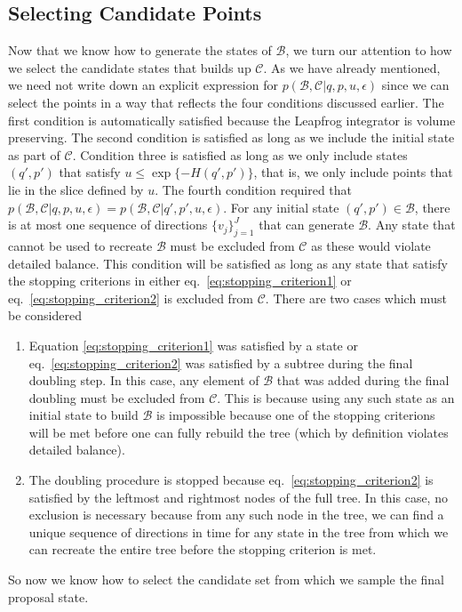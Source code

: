 \subsection{Selecting Candidate Points}
Now that we know how to generate the states of $\mathcal{B}$, we turn our attention to how we select the candidate states that builds up $\mathcal{C}$. 
As we have already mentioned, we need not write down an explicit expression for $p(\mathcal{B}, \mathcal{C}|q, p, u, \epsilon)$ since we can select the points in a way that reflects the four conditions discussed earlier. The first condition is automatically satisfied because the Leapfrog integrator is volume preserving. The second condition is satisfied as long as we include the initial state as part of $\mathcal{C}$. Condition three is satisfied as long as we only include states $(q', p')$ that satisfy $u \leq \exp\{-H(q', p')\}$, that is, we only include points that lie in the slice defined by $u$. The fourth condition required that $p(\mathcal{B}, \mathcal{C}|q, p, u, \epsilon) = p(\mathcal{B}, \mathcal{C}|q', p', u, \epsilon)$. For any initial state $(q', p') \in \mathcal{B}$, there is at most one sequence of directions $\{v_j\}_{j=1}^J$ that can generate $\mathcal{B}$. Any state that cannot be used to recreate $\mathcal{B}$ must be excluded from $\mathcal{C}$ as these would violate detailed balance. This condition will be satisfied as long as any state that satisfy the stopping criterions in either eq.~\eqref{eq:stopping_criterion1} or eq.~\eqref{eq:stopping_criterion2} is excluded from $\mathcal{C}$. There are two cases which must be considered
\begin{enumerate}
    \item Equation \eqref{eq:stopping_criterion1} was satisfied by a state or eq.~\eqref{eq:stopping_criterion2} was satisfied by a subtree during the final doubling step. In this case, any element of $\mathcal{B}$ that was added during the final doubling must be excluded from $\mathcal{C}$. This is because using any such state as an initial state to build $\mathcal{B}$ is impossible because one of the stopping criterions will be met before one can fully rebuild the tree (which by definition violates detailed balance).
    \item The doubling procedure is stopped because eq.~\eqref{eq:stopping_criterion2} is satisfied by the leftmost and rightmost nodes of the full tree. In this case, no exclusion is necessary because from any such node in the tree, we can find a unique sequence of directions in time for any state in the tree from which we can recreate the entire tree before the stopping criterion is met.
\end{enumerate}
So now we know how to select the candidate set from which we sample the final proposal state. 


